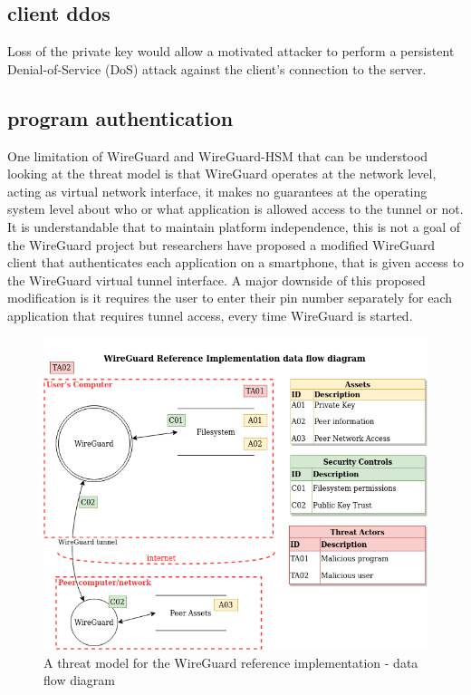 \documentclass [11pt, proquest] {uwthesis}[2020/02/24]
\begin{document}
\subsection{client ddos}
Loss of the private key would allow a motivated attacker to perform a persistent Denial-of-Service (DoS) attack against the client's connection to the server.


\subsection{program authentication}
One limitation of WireGuard and WireGuard-HSM that can be understood looking at the threat model is that WireGuard operates at the network level, acting as virtual network interface, it makes no guarantees at the operating system level about who or what application is allowed access to the tunnel or not. It is understandable that to maintain platform independence, this is not a goal of the WireGuard project but researchers have proposed a modified WireGuard client that authenticates each application on a smartphone, that is given access to the WireGuard virtual tunnel interface. A major downside of this proposed modification is it requires the user to enter their pin number separately for each application that requires tunnel access, every time WireGuard is started.\cite{wu_sewg_2020}



\begin{figure}[ht]
\includegraphics[width=14cm]{paper/images/WGH_DFD_preFB.drawio.png}
\caption{A threat model for the WireGuard reference implementation - data flow diagram}
\label{fig:wg_ref_dfd}
\end{figure}
\end{document}
